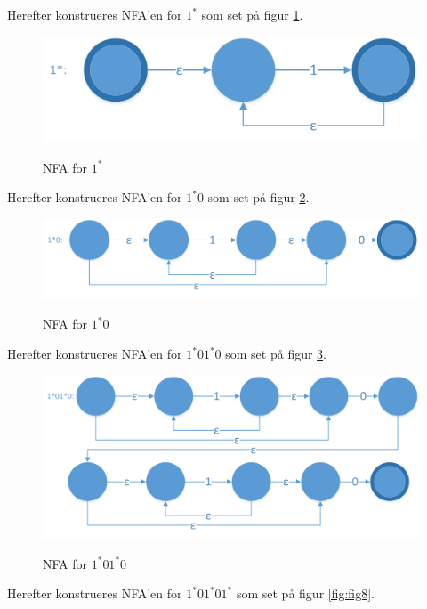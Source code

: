 \documentclass[a4paper,10pt,article]{memoir}
\begin{document}
Herefter konstrueres NFA'en for $1^*$ som set på figur \ref{fig:fig5}. 

\begin{figure}[h]%
\centering
\includegraphics[width=\textwidth]{Fig5x.png}
\label{fig:fig5}
\caption{NFA for $1^*$}
\end{figure}

Herefter konstrueres NFA'en for $1^*0$ som set på figur \ref{fig:fig6}. 

\begin{figure}[h]%
\centering
\includegraphics[width=\textwidth]{Fig6x.png}
\label{fig:fig6}
\caption{NFA for $1^*0$}
\end{figure}

Herefter konstrueres NFA'en for $1^*01^*0$ som set på figur \ref{fig:fig7}. 

\begin{figure}[h]%
\centering
\includegraphics[width=\textwidth]{Fig7x.png}
\label{fig:fig7}
\caption{NFA for $1^*01^*0$}
\end{figure}

Herefter konstrueres NFA'en for $1^*01^*01^*$ som set på figur \ref{fig:fig8}. 
\end{document}
